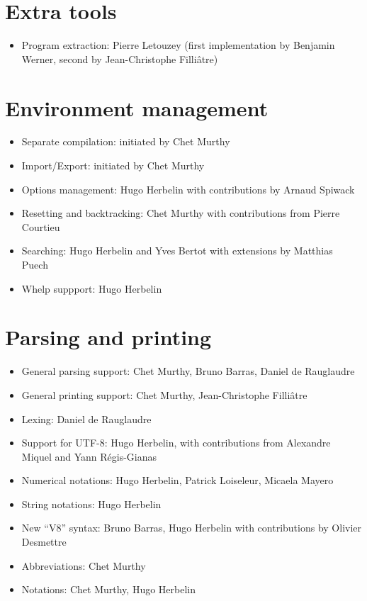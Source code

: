 \documentclass{article}
\begin{document}
\section{Extra tools}

\begin{itemize}
\item Program extraction: Pierre Letouzey (first implementation by
  Benjamin Werner, second by Jean-Christophe Filliâtre)
\end{itemize}

\section{Environment management}

\begin{itemize}
\item Separate compilation: initiated by Chet Murthy
\item Import/Export: initiated by Chet Murthy
\item Options management: Hugo Herbelin with contributions by Arnaud Spiwack
\item Resetting and backtracking: Chet Murthy with contributions from Pierre Courtieu
\item Searching: Hugo Herbelin and Yves Bertot with extensions by Matthias Puech
\item Whelp suppport: Hugo Herbelin
\end{itemize}

\section{Parsing and printing}

\begin{itemize}
\item General parsing support: Chet Murthy, Bruno Barras, Daniel de Rauglaudre
\item General printing support: Chet Murthy, Jean-Christophe Filliâtre
\item Lexing: Daniel de Rauglaudre
\item Support for UTF-8: Hugo Herbelin, with contributions from Alexandre Miquel and Yann Régis-Gianas
\item Numerical notations: Hugo Herbelin, Patrick Loiseleur, Micaela Mayero
\item String notations: Hugo Herbelin
\item New ``V8'' syntax: Bruno Barras, Hugo Herbelin with contributions by Olivier Desmettre
\item Abbreviations: Chet Murthy
\item Notations: Chet Murthy, Hugo Herbelin
\end{itemize}
\end{document}
